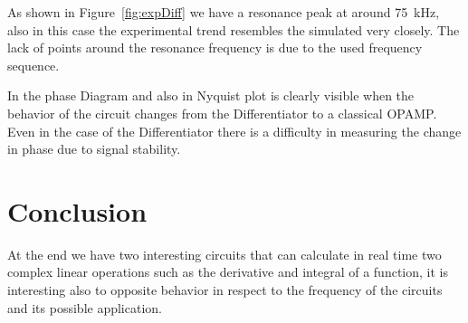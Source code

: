 \documentclass[a4paper, twocolumn]{article}
\begin{document}


As shown in Figure~\ref{fig:expDiff} we have a resonance peak at around \SI{75}{\kilo\hertz}, also in this case the experimental trend resembles the simulated very closely. The lack of points around the resonance frequency is due to the used frequency sequence.

In the phase Diagram and also in Nyquist plot is clearly visible when the behavior of the circuit changes from the Differentiator to a classical OPAMP. Even in the case of the Differentiator there is a difficulty in measuring the change in phase due to signal stability.

\section{Conclusion}

At the end we have two interesting circuits that can calculate in real time two complex linear operations such as the derivative and integral of a function, it is interesting also to opposite behavior in respect to the frequency of the circuits and its possible application.  
\end{document}
